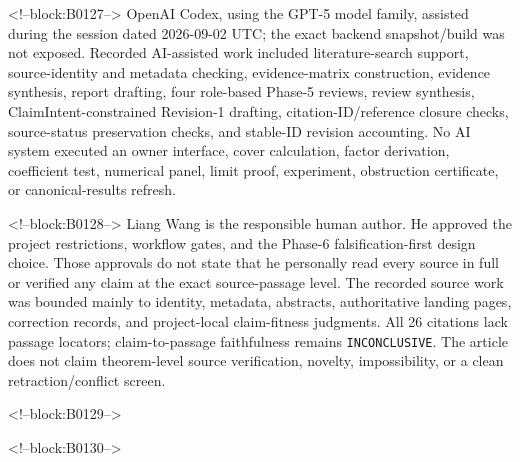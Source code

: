 \documentclass[11pt]{article}
\begin{document}
<!--block:B0127-->
OpenAI Codex, using the GPT-5 model family, assisted during the session
dated 2026-09-02 UTC; the exact backend snapshot/build was not exposed.
Recorded AI-assisted work included literature-search support,
source-identity and metadata checking, evidence-matrix construction,
evidence synthesis, report drafting, four role-based Phase-5 reviews,
review synthesis, ClaimIntent-constrained Revision-1 drafting,
citation-ID/reference closure checks, source-status preservation checks,
and stable-ID revision accounting. No AI system executed an owner
interface, cover calculation, factor derivation, coefficient test,
numerical panel, limit proof, experiment, obstruction certificate, or
canonical-results refresh.

<!--block:B0128-->
Liang Wang is the responsible human author. He approved the project
restrictions, workflow gates, and the Phase-6 falsification-first design
choice. Those approvals do not state that he personally read every
source in full or verified any claim at the exact source-passage level.
The recorded source work was bounded mainly to identity, metadata,
abstracts, authoritative landing pages, correction records, and
project-local claim-fitness judgments. All 26 citations lack passage
locators; claim-to-passage faithfulness remains \texttt{INCONCLUSIVE}.
The article does not claim theorem-level source verification, novelty,
impossibility, or a clean retraction/conflict screen.

<!--block:B0129-->



<!--block:B0130-->
\end{document}
